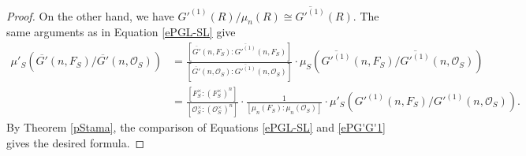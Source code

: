\documentclass[10pt,a4paper]{amsart}
\begin{document}
\begin{proof}
On the other hand, we have $G'^{(1)}(R)/\mu_{n}(R)\cong \overline{G'^{(1)}}(R)$. 
The same arguments as in Equation \eqref{ePGL-SL} give
\begin{equation}\label{ePG'G'1}
\begin{aligned}
    \mu'_{S}(\overline{G'}(n,F_S)/\overline{G'}(n,\mathcal{O}_S))&=\frac{[\overline{G'}(n,F_S):\overline{G'^{(1)}}(n,F_S)]}{[\overline{G'}(n,\mathcal{O}_S):\overline{G'^{(1)}}(n,\mathcal{O}_S)]}\cdot \mu_{S}(\overline{G'^{(1)}}(n,F_S)/\overline{G'^{(1)}}(n,\mathcal{O}_S))\\&=\frac{[F_S^{\times}:(F_S^{\times})^n]}{[\mathcal{O}_S^{\times}:(\mathcal{O}_S^{\times})^n]}\cdot \frac{1}{[\mu_n(F_S):\mu_n(\mathcal{O}_S)]}\cdot \mu'_{S}(G'^{(1)}(n,F_S)/G'^{(1)}(n,\mathcal{O}_S)). 
\end{aligned}
\end{equation}
By Theorem \ref{pStama}, the comparison of Equations \eqref{ePGL-SL} and \eqref{ePG'G'1} gives the desired formula. 
\end{proof}
\end{document}
